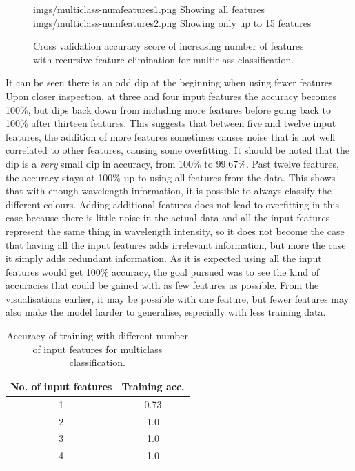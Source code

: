 \documentclass{article}
\begin{document}
\begin{figure}[H]
\centering
{}
{imgs/multiclass-numfeatures1.png}
{Showing all features}
\hspace*{\fill}
{imgs/multiclass-numfeatures2.png}
{Showing only up to 15 features}
\caption{Cross validation accuracy score of increasing number of features with recursive feature elimination for multiclass classification.}
\end{figure}
\noindent
It can be seen there is an odd dip at the beginning when using fewer features. Upon closer inspection, at three and four input features the accuracy becomes 100\%, but dips back down from including more features before going back to 100\% after thirteen features. This suggests that between five and twelve input features, the addition of more features sometimes causes noise that is not well correlated to other features, causing some overfitting. It should be noted that the dip is a \textit{very} small dip in accuracy, from 100\% to 99.67\%. Past twelve features, the accuracy stays at 100\% up to using all features from the data. This shows that with enough wavelength information, it is possible to always classify the different colours. Adding additional features does not lead to overfitting in this case because there is little noise in the actual data and all the input features represent the same thing in wavelength intensity, so it does not become the case that having all the input features adds irrelevant information, but more the case it simply adds redundant information. 
\n
As it is expected using all the input features would get 100\% accuracy, the goal pursued was to see the kind of accuracies that could be gained with as few features as possible. From the visualisations earlier, it may be possible with one feature, but fewer features may also make the model harder to generalise, especially with less training data. 
\begin{table}[H]
\centering
\begin{tabular}{| c | c |}
\hline
\textbf{No. of input features} & \textbf{Training acc.} \\
\hline
1 & 0.73 \\
\hline
2 & 1.0 \\
\hline
3 & 1.0 \\
\hline
4 & 1.0 \\
\hline
\end{tabular}
\caption{Accuracy of training with different number of input features for multiclass classification.}
\end{table} 
\end{document}

